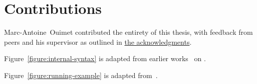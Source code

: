 \chapter*{Contributions}

Marc-Antoine~Ouimet contributed the entirety of this thesis, with feedback from peers and his supervisor as outlined in \hyperref[chapter:acknowledgments]{the acknowledgments}.

\noindent
Figure~\ref{figure:internal-syntax} is adapted from earlier works~\cite{nanevski2008contextual, germain2010implementation, cave2013first, ferreira2013compiling} on \Beluga.

\noindent
Figure~\ref{figure:running-example} is adapted from~\cite{felty2010reasoning}.
